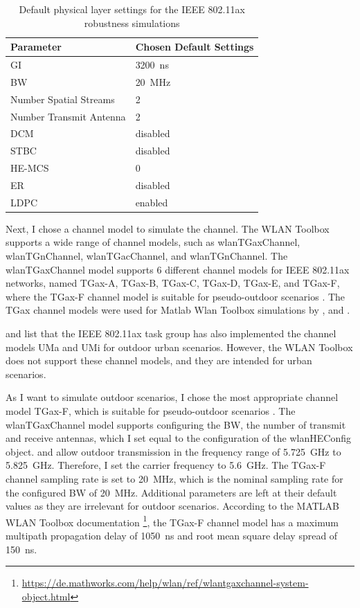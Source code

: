 \begin{table}
   \centering
   \begin{tabular}{>{\raggedright}p{4.5cm}p{4.5cm}}
      \toprule
      Parameter & Chosen Default Settings \\
      \midrule
      \ac{GI} & \SI{3200}{\nano\second} \\
      \ac{BW} & \SI{20}{\mega\hertz} \\
      Number Spatial Streams & \num{2}\\
      Number Transmit Antenna & \num{2} \\
      \ac{DCM} & disabled \\
      \ac{STBC} & disabled \\
      \ac{HE}-\ac{MCS} & \num{0} \\
      \ac{ER} & disabled \\
      \ac{LDPC} & enabled \\
      \bottomrule
   \end{tabular}
   \caption{Default physical layer settings for the IEEE 802.11ax robustness simulations}
   \label{tab:robustnessDefaultSettings}
\end{table}

Next, I chose a channel model to simulate the channel.
The WLAN Toolbox supports a wide range of channel models, such as wlanTGaxChannel, wlanTGnChannel, wlanTGacChannel, and wlanTGnChannel.
The wlanTGaxChannel model supports \num{6} different channel models for IEEE 802.11ax networks, named TGax-A, TGax-B, TGax-C, TGax-D, TGax-E, and TGax-F,
where the TGax-F channel model is suitable for pseudo-outdoor scenarios \cite{TGAXCHANNEL}.
The TGax channel models were used for Matlab Wlan Toolbox simulations by \cite{sheela_performance_2022}, \cite{cao_efficient_2022} and \cite{jin_efficient_2021}.

\cite{TGAXCHANNEL} and \cite{omar_survey_2016} list that the IEEE 802.11ax task group has also implemented the channel models UMa and UMi for outdoor urban scenarios.
However, the WLAN Toolbox does not support these channel models, and they are intended for urban scenarios.



As I want to simulate outdoor scenarios, I chose the most appropriate channel model TGax-F, which is suitable for pseudo-outdoor scenarios \cite{TGAXCHANNEL}.
The wlanTGaxChannel model supports configuring the \ac{BW}, the number of transmit and receive antennas, which I set equal to the configuration of the wlanHEConfig object.
\cite{freq_plan_24G} and \cite{freq_plan_5G} allow outdoor transmission in the frequency range of \SI{5.725}{\giga\hertz} to \SI{5.825}{\giga\hertz}.
Therefore, I set the carrier frequency to \SI{5.6}{\giga\hertz}.
The TGax-F channel sampling rate is set to \SI{20}{\mega\hertz}, which is the nominal sampling rate for the configured \ac{BW} of \SI{20}{\mega\hertz}.
Additional parameters are left at their default values as they are irrelevant for outdoor scenarios.
According to the MATLAB WLAN Toolbox documentation \footnote{\url{https://de.mathworks.com/help/wlan/ref/wlantgaxchannel-system-object.html}},
the TGax-F channel model has a maximum multipath propagation delay of \SI{1050}{\nano\second} and root mean square delay spread of \SI{150}{\nano\second}.

